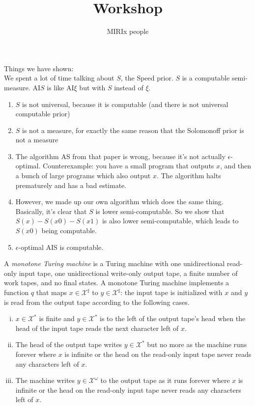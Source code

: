 \documentclass[11pt]{amsart}
\title{Workshop}
\author{MIRIx people}
\def\X{\mathcal{X}}
\begin{document}
\maketitle

Things we have shown:\\

We spent a lot of time talking about $S$, the Speed prior. $S$ is a computable semi-measure. AI$S$ is like AI$\xi$ but with $S$ instead of $\xi$.\\

\begin{enumerate}
\item $S$ is not universal, because it is computable (and there is not universal computable prior)
\item $S$ is not a measure, for exactly the same reason that the Solomonoff prior is not a measure
\item The algorithm AS from that paper is wrong, because it's not actually $\epsilon$-optimal. Counterexample: you have a small program that outputs $x$, and then a bunch of large programs which also output $x$. The algorithm halts prematurely and has a bad estimate.
\item However, we made up our own algorithm which does the same thing. Basically, it's clear that $S$ is lower semi-computable. So we show that $S(x)- S(x0) - S(x1)$ is also lower semi-computable, which leads to $S(x0)$ being computable.
\item $\epsilon$-optimal AIS is computable.
\end{enumerate}



\begin{definition}
\label{def:monotone-TM}
A \emph{monotone Turing machine}
is a Turing machine with
one unidirectional read-only input tape,
one unidirectional write-only output tape,
a finite number of work tapes, and no final states.
A monotone Turing machine implements a function $q$
that maps $x \in \X^\sharp$ to $y \in \X^\sharp$:
the input tape is initialized with $x$
and $y$ is read from the output tape according to the following cases.
\begin{enumerate}[(i)]
\item $x \in \X^*$ is finite and
	$y \in \X^*$ is to the left of the output tape's head when
	the head of the input tape reads the next character left of $x$.
\item The head of the output tape writes $y \in \X^*$ but no more
	as the machine runs forever where
	$x$ is infinite or
	the head on the read-only input tape never reads any characters left of $x$.
\item The machine writes $y \in \X^\omega$ to the output tape
	as it runs forever where
	$x$ is infinite or
	the head on the read-only input tape never reads any characters left of $x$.
\end{enumerate}
\end{definition}




\end{document}
